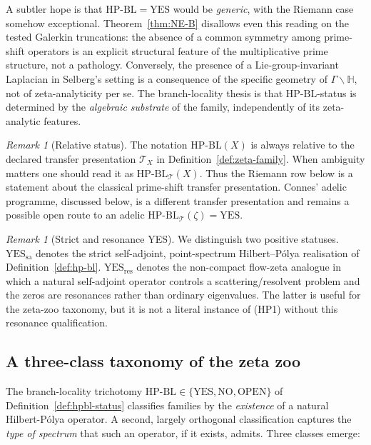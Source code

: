 \documentclass[11pt]{article}
\theoremstyle{definition}
\theoremstyle{remark}
\newtheorem{remark}[theorem]{Remark}
\newcommand{\HBL}{\mathrm{HP\text{-}BL}}
\begin{document}
A subtler hope is that $\HBL = \mathrm{YES}$ would be \emph{generic},
with the Riemann case somehow exceptional. Theorem~\ref{thm:NE-B}
disallows even this reading on the tested Galerkin truncations: the
absence of a common symmetry among prime-shift operators is an
explicit structural feature of the multiplicative prime structure,
not a pathology. Conversely, the presence of a Lie-group-invariant
Laplacian in Selberg's setting is a consequence of the specific
geometry of $\Gamma\backslash\mathbb{H}$, not of zeta-analyticity per
se. The branch-locality thesis is that $\HBL$-status is determined
by the \emph{algebraic substrate} of the family, independently of
its zeta-analytic features.

\begin{remark}[Relative status]\label{rem:relative-hbl}
The notation $\HBL(X)$ is always relative to the declared transfer
presentation $\mathcal{T}_X$ in Definition~\ref{def:zeta-family}.
When ambiguity matters one should read it as $\HBL_{\mathcal{T}}(X)$.
Thus the Riemann row below is a statement about the classical
prime-shift transfer presentation. Connes' adelic programme, discussed
below, is a different transfer presentation and remains a possible
open route to an adelic $\HBL_{\mathcal{T}}(\zeta)=\mathrm{YES}$.
\end{remark}

\begin{remark}[Strict and resonance YES]\label{rem:yes-types}
We distinguish two positive statuses. $\mathrm{YES}_{\mathrm{sa}}$
denotes the strict self-adjoint, point-spectrum Hilbert--P\'olya
realisation of Definition~\ref{def:hp-bl}. $\mathrm{YES}_{\mathrm{res}}$
denotes the non-compact flow-zeta analogue in which a natural
self-adjoint operator controls a scattering/resolvent problem and the
zeros are resonances rather than ordinary eigenvalues. The latter is
useful for the zeta-zoo taxonomy, but it is not a literal instance of
(HP1) without this resonance qualification.
\end{remark}

\subsection{A three-class taxonomy of the zeta zoo}
\label{sec:three-class-taxonomy}

The branch-locality trichotomy
$\HBL \in \{\mathrm{YES}, \mathrm{NO}, \mathrm{OPEN}\}$ of
Definition~\ref{def:hpbl-status} classifies families by the
\emph{existence} of a natural Hilbert-P\'olya operator. A second,
largely orthogonal classification captures the \emph{type of spectrum}
that such an operator, if it exists, admits. Three classes emerge:
\end{document}

